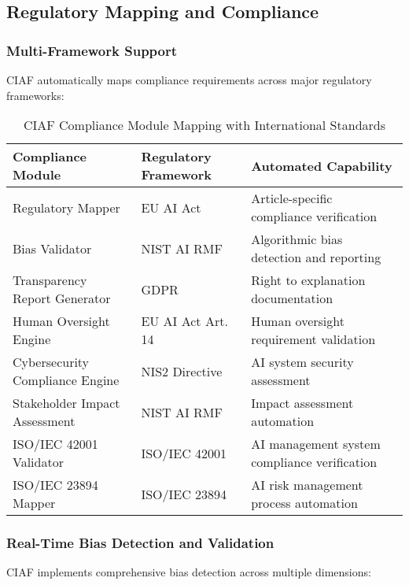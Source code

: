 \documentclass[12pt,a4paper]{article}
\begin{document}
\subsection{Regulatory Mapping and Compliance}

\subsubsection{Multi-Framework Support}

CIAF automatically maps compliance requirements across major regulatory frameworks:

\begin{table}[H]
\centering
\footnotesize
\renewcommand{\arraystretch}{1.3}
\begin{tabular}{|>{\raggedright\arraybackslash}p{3.8cm}|>{\raggedright\arraybackslash}p{2.7cm}|>{\raggedright\arraybackslash}p{6cm}|}
\hline
\textbf{Compliance Module} & \textbf{Regulatory Framework} & \textbf{Automated Capability} \\
\hline
Regulatory Mapper & EU AI Act & Article-specific compliance verification \\
\hline
Bias Validator & NIST AI RMF & Algorithmic bias detection and reporting \\
\hline
Transparency Report Generator & GDPR & Right to explanation documentation \\
\hline
Human Oversight Engine & EU AI Act Art. 14 & Human oversight requirement validation \\
\hline
Cybersecurity Compliance Engine & NIS2 Directive & AI system security assessment \\
\hline
Stakeholder Impact Assessment & NIST AI RMF & Impact assessment automation \\
\hline
ISO/IEC 42001 Validator & ISO/IEC 42001 & AI management system compliance verification \\
\hline
ISO/IEC 23894 Mapper & ISO/IEC 23894 & AI risk management process automation \\
\hline
\end{tabular}
\caption{CIAF Compliance Module Mapping with International Standards}
\end{table}

\subsubsection{Real-Time Bias Detection and Validation}

CIAF implements comprehensive bias detection across multiple dimensions:
\end{document}
